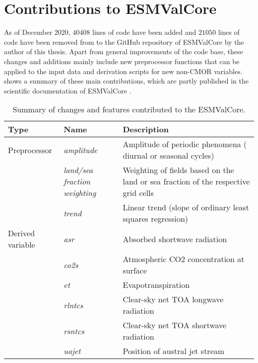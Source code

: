 \section{Contributions to \acs{ESMValCore}}
\label{sec:03:contributions_to_esmvalcore}

As of December 2020, $40408$ lines of code have been added and $21050$ lines of
code have been removed from to the GitHub repository of \ac{ESMValCore} by the
author of this thesis. Apart from general improvements of the code base, these
changes and additions mainly include new preprocessor functions that can be
applied to the input data and derivation scripts for new non-\ac{CMOR}
variables.  shows a summary of these main
contributions, which are partly published in the scientific documentation of
\ac{ESMValCore} \autocite{Righi2020}.

\begin{table}[t]
  \centering
  \begin{tabulary}{\columnwidth}{L L L}
    \toprule
    Type & Name & Description \\
    \midrule
    Preprocessor & \emph{amplitude} & Amplitude of periodic phenomena (\eg{}
    diurnal or seasonal cycles) \\
    \cmidrule(l){2-3}
    & \emph{land/sea fraction weighting} & Weighting of fields based on
    the land or sea fraction of the respective grid cells \\
    \cmidrule(l){2-3}
    & \emph{trend} & Linear trend (slope of ordinary least squares regression)
    \\
    \midrule
    Derived variable & \emph{asr} & Absorbed shortwave radiation \\
    \cmidrule(l){2-3}
    & \emph{co2s} & Atmospheric \ac{CO2} concentration at
    surface \\
    \cmidrule(l){2-3}
    & \emph{et} & Evapotranspiration \\
    \cmidrule(l){2-3}
    & \emph{rlntcs} & Clear-sky net \acf{TOA} longwave radiation \\
    \cmidrule(l){2-3}
    & \emph{rsntcs} & Clear-sky net \ac{TOA} shortwave radiation \\
    \cmidrule(l){2-3}
    & \emph{uajet} & Position of austral jet stream \\
    \bottomrule
  \end{tabulary}
  \caption{Summary of changes and features contributed to the
    \acf{ESMValCore}.}
  \label{tab:03:changes_to_esmvalcore}
\end{table}


